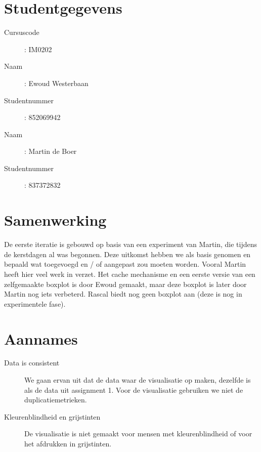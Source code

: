 \documentclass[a4paper]{article}
\begin{document}
\pagestyle{fancy}

\section*{Studentgegevens}
\begin{description}
	\item [Cursuscode]: IM0202
	\item [Naam]: Ewoud Westerbaan
	\item [Studentnummer]: 852069942
	\item [Naam]: Martin de Boer
	\item [Studentnummer]: 837372832
\end{description}

\section{Samenwerking}
De eerste iteratie is gebouwd op basis van een experiment van Martin, die tijdens de kerstdagen al was begonnen. Deze uitkomst hebben we als basis genomen en bepaald wat toegevoegd en / of aangepast zou moeten worden. Vooral Martin heeft hier veel werk in verzet.
Het cache mechanisme en een eerste versie van een zelfgemaakte boxplot is door Ewoud gemaakt, maar deze boxplot is later door Martin nog iets verbeterd. Rascal biedt nog geen boxplot aan (deze is nog in experimentele fase).


\section{Aannames}
\begin{description}
\item[Data is consistent] We gaan ervan uit dat de data waar de visualisatie op maken, dezelfde is als de data uit assignment 1. Voor de visualisatie gebruiken we niet de duplicatiemetrieken.
\item[Kleurenblindheid en grijstinten] De visualisatie is niet gemaakt voor mensen met kleurenblindheid of voor het afdrukken in grijstinten.
\end{description}
\end{document}
